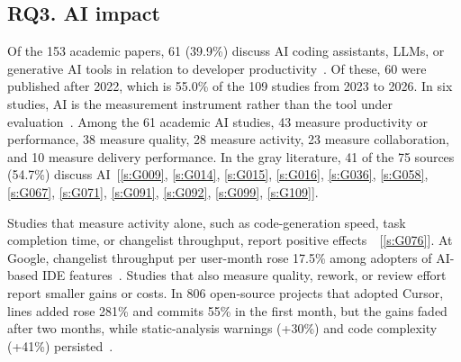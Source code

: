 \documentclass[preprint,number]{elsarticle}
\newcommand{\refG}[1]{\ref{s:#1}}
\begin{document}
\subsection{RQ3. AI impact}
\label{sec:rq3}

Of the 153 academic papers, 61 (39.9\%) discuss AI coding assistants, LLMs, or generative AI tools in relation to developer productivity~\cite{P0030, P0244, P0549, P0591, P1299, P1303, P1402, P1816, P2019, P2025, P2029, P2032}. Of these, 60 were published after 2022, which is 55.0\% of the 109 studies from 2023 to 2026. In six studies, AI is the measurement instrument rather than the tool under evaluation~\cite{P2014, P2026, P2044, P2056, P2060, P2108}. Among the 61 academic AI studies, 43 measure productivity or performance, 38 measure quality, 28 measure activity, 23 measure collaboration, and 10 measure delivery performance. In the gray literature, 41 of the 75 sources (54.7\%) discuss AI~[\refG{G009}, \refG{G014}, \refG{G015}, \refG{G016}, \refG{G036}, \refG{G058}, \refG{G067}, \refG{G071}, \refG{G091}, \refG{G092}, \refG{G099}, \refG{G109}].

Studies that measure activity alone, such as code-generation speed, task completion time, or changelist throughput, report positive effects~\cite{P0549, P2029}~[\refG{G076}]. At Google, changelist throughput per user-month rose 17.5\% among adopters of AI-based IDE features~\cite{P2029}. Studies that also measure quality, rework, or review effort report smaller gains or costs. In 806 open-source projects that adopted Cursor, lines added rose 281\% and commits 55\% in the first month, but the gains faded after two months, while static-analysis warnings (+30\%) and code complexity (+41\%) persisted~\cite{P2032}.
\end{document}
